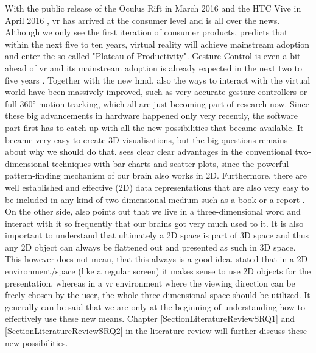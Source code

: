 With the public release of the Oculus Rift in March 2016 \citep{Oculus2016} and the HTC Vive in April 2016 \citep{Htcvive2016}, \gls{vr} has arrived at the consumer level and is all over the news. Although we only see the first iteration of consumer products, \cite{Gartner2015} predicts that within the next five to ten years, virtual reality will achieve mainstream adoption and enter the so called "Plateau of Productivity". Gesture Control is even a bit ahead of \gls{vr} and its mainstream adoption is already expected in the next two to five years \citep{Gartner2015}. Together with the new \gls{hmd}, also the ways to interact with the virtual world have been massively improved, such as very accurate gesture controllers or full 360° motion tracking, which all are just becoming part of research now. Since these big advancements in hardware happened only very recently, the software part first has to catch up with all the new possibilities that became available. It became very easy to create 3D visualisations, but the big questions remains about why we should do that. \cite{Ware2012} sees clear clear advantages in the conventional two-dimensional techniques with bar charts and scatter plots, since the powerful pattern-finding mechanism of our brain also works in 2D. Furthermore, there are well established and effective (2D) data representations that are also very easy to be included in any kind of two-dimensional medium such as a book or a report \citep{Ware2012}. On the other side, \cite{Ware2012} also points out that we live in a three-dimensional word and interact with it so frequently that our brains got very much used to it. It is also important to understand that ultimately a 2D space is part of 3D space and thus any 2D object can always be flattened out and presented as such in 3D space. This however does not mean, that this always is a good idea. \cite{Kwon2015} stated that in a 2D environment/space (like a regular screen) it makes sense to use 2D objects for the presentation, whereas in a \gls{vr} environment where the viewing direction can be freely chosen by the user, the whole three dimensional space should be utilized. It generally can be said that we are only at the beginning of understanding how to effectively use these new means. Chapter \ref{SectionLiteratureReviewSRQ1} and \ref{SectionLiteratureReviewSRQ2} in the literature review will further discuss these new possibilities.

